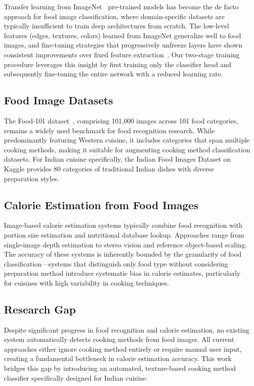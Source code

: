 \documentclass[journal]{IEEEtran}
\begin{document}
Transfer learning from ImageNet~\cite{deng2009imagenet} pre-trained models has become the de facto approach for food image classification, where domain-specific datasets are typically insufficient to train deep architectures from scratch. The low-level features (edges, textures, colors) learned from ImageNet generalize well to food images, and fine-tuning strategies that progressively unfreeze layers have shown consistent improvements over fixed feature extraction~\cite{shorten2019survey}. Our two-stage training procedure leverages this insight by first training only the classifier head and subsequently fine-tuning the entire network with a reduced learning rate.

\subsection{Food Image Datasets}

The Food-101 dataset~\cite{bossard2014food}, comprising 101,000 images across 101 food categories, remains a widely used benchmark for food recognition research. While predominantly featuring Western cuisine, it includes categories that span multiple cooking methods, making it suitable for augmenting cooking method classification datasets. For Indian cuisine specifically, the Indian Food Images Dataset on Kaggle provides 80 categories of traditional Indian dishes with diverse preparation styles.

\subsection{Calorie Estimation from Food Images}

Image-based calorie estimation systems typically combine food recognition with portion size estimation and nutritional database lookup. Approaches range from single-image depth estimation to stereo vision and reference object-based scaling. The accuracy of these systems is inherently bounded by the granularity of food classification---systems that distinguish only food type without considering preparation method introduce systematic bias in calorie estimates, particularly for cuisines with high variability in cooking techniques.

\subsection{Research Gap}

Despite significant progress in food recognition and calorie estimation, no existing system automatically detects cooking methods from food images. All current approaches either ignore cooking method entirely or require manual user input, creating a fundamental bottleneck in calorie estimation accuracy. This work bridges this gap by introducing an automated, texture-based cooking method classifier specifically designed for Indian cuisine.
\end{document}
